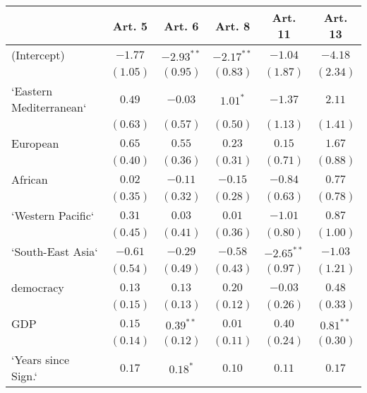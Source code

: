 
\begin{table}[!h]
\begin{center}
\begin{tabular}{l c c c c c }
\toprule
 & Art. 5 & Art. 6 & Art. 8 & Art. 11 & Art. 13 \\
\midrule
(Intercept)             & $-1.77$      & $-2.93^{**}$ & $-2.17^{**}$ & $-1.04$      & $-4.18$      \\
                        & $(1.05)$     & $(0.95)$     & $(0.83)$     & $(1.87)$     & $(2.34)$     \\
`Eastern Mediterranean` & $0.49$       & $-0.03$      & $1.01^{*}$   & $-1.37$      & $2.11$       \\
                        & $(0.63)$     & $(0.57)$     & $(0.50)$     & $(1.13)$     & $(1.41)$     \\
European                & $0.65$       & $0.55$       & $0.23$       & $0.15$       & $1.67$       \\
                        & $(0.40)$     & $(0.36)$     & $(0.31)$     & $(0.71)$     & $(0.88)$     \\
African                 & $0.02$       & $-0.11$      & $-0.15$      & $-0.84$      & $0.77$       \\
                        & $(0.35)$     & $(0.32)$     & $(0.28)$     & $(0.63)$     & $(0.78)$     \\
`Western Pacific`       & $0.31$       & $0.03$       & $0.01$       & $-1.01$      & $0.87$       \\
                        & $(0.45)$     & $(0.41)$     & $(0.36)$     & $(0.80)$     & $(1.00)$     \\
`South-East Asia`       & $-0.61$      & $-0.29$      & $-0.58$      & $-2.65^{**}$ & $-1.03$      \\
                        & $(0.54)$     & $(0.49)$     & $(0.43)$     & $(0.97)$     & $(1.21)$     \\
democracy               & $0.13$       & $0.13$       & $0.20$       & $-0.03$      & $0.48$       \\
                        & $(0.15)$     & $(0.13)$     & $(0.12)$     & $(0.26)$     & $(0.33)$     \\
GDP                     & $0.15$       & $0.39^{**}$  & $0.01$       & $0.40$       & $0.81^{**}$  \\
                        & $(0.14)$     & $(0.12)$     & $(0.11)$     & $(0.24)$     & $(0.30)$     \\
`Years since Sign.`     & $0.17$       & $0.18^{*}$   & $0.10$       & $0.11$       & $0.17$       \\

\end{tabular}
\end{center}
\end{table}
